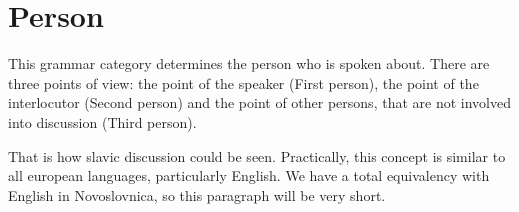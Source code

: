 \section{Person}

This grammar category determines the person who is spoken about. There are three points of view: the point of the speaker (First person), the point of the interlocutor (Second person) and the point of other persons, that are not involved into discussion (Third person).

That is how slavic discussion could be seen. Practically, this concept is similar to all european languages, particularly English. We have a total equivalency with English in Novoslovnica, so this paragraph will be very short.
